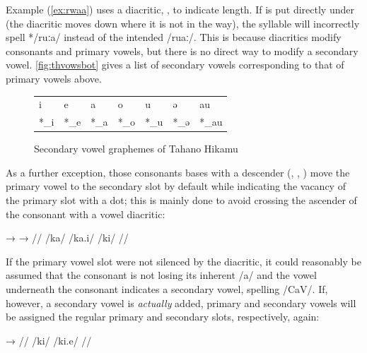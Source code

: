 Example (\ref{ex:rwaa}) uses a diacritic, , to indicate length. If 
is put directly under  (the  diacritic moves down where 
it is not in the way), the syllable will incorrectly spell */ruːa/ instead of 
the intended /ruaː/. This is because diacritics modify consonants and primary 
vowels, but there is no direct way to modify a secondary vowel. 
\autoref{fig:thvowsbot} gives a list of secondary vowels corresponding to that 
of primary vowels above.

\begin{figure}[ht]
\caption{Secondary vowel graphemes of Tahano Hikamu}

\begin{tabu} to \linewidth{X[c] X[c] X[c] X[c] X[c] X[c] X[c]}
\toprule
\tableheaderfont	i & e & a & o & u & ə & au \\
\rowfont{\Tagati\huge}	*\_i & *\_e & *\_a & *\_o & *\_u & *\_ə & *\_au \\

\bottomrule
\end{tabu}
\label{fig:thvowsbot}
\end{figure}

As a further exception, those consonants bases with a descender (, 
, ) move the primary vowel to the secondary slot by default while 
indicating the vacancy of the primary slot with a dot; this is mainly done to 
avoid crossing the ascender of the consonant with a vowel diacritic:

\pex[lingstyle=thex]\begingl
	\gla {}	→		→	 //
	\glb /ka/	{}	/ka.i/		{}	/ki/ //
\endgl\xe

If the primary vowel slot were not silenced by the  diacritic, it 
could reasonably be assumed that the consonant is not losing its inherent /a/ 
and the vowel underneath the consonant indicates a secondary vowel, spelling 
/CaV/. If, however, a secondary vowel is \emph{actually} added, primary and 
secondary vowels will be assigned the regular primary and secondary slots, 
respectively, again:

\pex[lingstyle=thex]\begingl
	\gla {}	→	 //
	\glb /ki/	{}	/ki.e/ //
\endgl\xe

